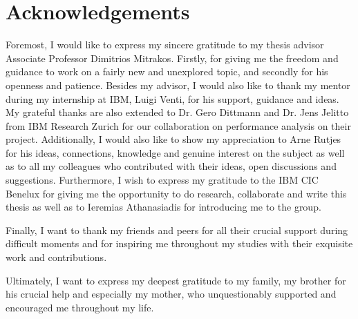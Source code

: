 \chapter*{Acknowledgements}
Foremost, I would like to express my sincere gratitude to my thesis advisor Associate Professor Dimitrios Mitrakos. Firstly, for giving me the freedom and guidance to work on a fairly new and unexplored topic, and secondly for his openness and patience. Besides my advisor, I would also like to thank my mentor during my internship at IBM, Luigi Venti, for his support, guidance and ideas. My grateful thanks are also extended to Dr. Gero Dittmann and Dr. Jens Jelitto from IBM Research Zurich for our collaboration on performance analysis on their project. Additionally, I would also like to show my appreciation to Arne Rutjes for his ideas, connections, knowledge and genuine interest on the subject as well as to all my colleagues who contributed with their ideas, open discussions and suggestions. Furthermore, I wish to express my gratitude to the IBM CIC Benelux for giving me the opportunity to do research, collaborate and write this thesis as well as to Ieremias Athanasiadis for introducing me to the group.

Finally, I want to thank my friends and peers for all their crucial support during difficult moments and for inspiring me throughout my studies with their exquisite work and contributions.

Ultimately, I want to express my deepest gratitude to my family, my brother for his crucial help and especially my mother, who unquestionably supported and encouraged me throughout my life.